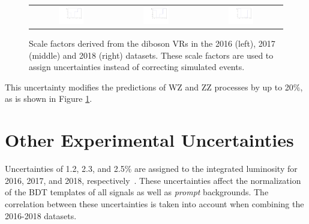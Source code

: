 \begin{figure}[tbh!]
 \begin{center}
 \begin{tabular}{ccc}
 \includegraphics[width=0.325\textwidth]{figures/Part3/Systematics/2016_VV_Sys_1D}&
  \includegraphics[width=0.325\textwidth]{figures/Part3/Systematics/2017_VV_Sys_1D}&
 \includegraphics[width=0.325\textwidth]{figures/Part3/Systematics/2018_VV_Sys_1D}\\
 \end{tabular}
 \caption{Scale factors derived from the diboson \acp{VR} in the 2016 (left), 2017 (middle) and 2018 (right) datasets. These scale factors are used to assign uncertainties instead of correcting simulated events.}
 \label{fig:SF_VV}
 \end{center}
\end{figure}

This uncertainty modifies the predictions of WZ and ZZ processes by up to 20$\%$, as is shown in Figure \ref{fig:SF_VV}.

\section{Other Experimental Uncertainties}
\label{sec:OthUnc}

Uncertainties of 1.2, 2.3, and 2.5\% are assigned to the integrated luminosity for 2016, 2017, and 2018, respectively~\cite{CMS:2021xjt,CMS-LUM-17-004,CMS-LUM-18-002}. These uncertainties affect the normalization of the \ac{BDT} templates of all signals as well as \emph{prompt} backgrounds. The correlation between these uncertainties is taken into account when combining the 2016-2018 datasets. 

